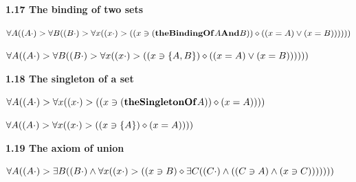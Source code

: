 \documentclass{article}
\begin{document}
\par\bigskip{}\label{theBindingOfTwoSets}
\noindent\textbf{1.17 The binding of two sets}\par\smallskip
\begingroup\small
\begin{fitchproof}

\end{fitchproof}
\endgroup

\noindent\(\displaystyle \forall A((A\mathbin{\cdot})>\forall B((B\mathbin{\cdot})>\forall x((x\mathbin{\cdot})>((x\owns(\mathbf{theBindingOf} A\mathbf{And} B))\diamond((x=A)\lor(x=B))))))\)\par
\noindent\(\displaystyle \forall A((A\mathbin{\cdot})>\forall B((B\mathbin{\cdot})>\forall x((x\mathbin{\cdot})>((x\owns\{A,B\})\diamond((x=A)\lor(x=B))))))\)\par

\par\bigskip{}\label{theSingletonOfASet}
\noindent\textbf{1.18 The singleton of a set}\par\smallskip
\begingroup\small
\begin{fitchproof}

\end{fitchproof}
\endgroup

\noindent\(\displaystyle \forall A((A\mathbin{\cdot})>\forall x((x\mathbin{\cdot})>((x\owns(\mathbf{theSingletonOf} A))\diamond(x=A))))\)\par
\noindent\(\displaystyle \forall A((A\mathbin{\cdot})>\forall x((x\mathbin{\cdot})>((x\owns\{A\})\diamond(x=A))))\)\par

\par\bigskip{}\label{theAxiomOfUnion}
\noindent\textbf{1.19 The axiom of union}\par\smallskip
\noindent\(\displaystyle \forall A((A\mathbin{\cdot})>\exists B((B\mathbin{\cdot})\land\forall x((x\mathbin{\cdot})>((x\owns B)\diamond\exists C((C\mathbin{\cdot})\land((C\owns A)\land(x\owns C)))))))\)\par
\end{document}
